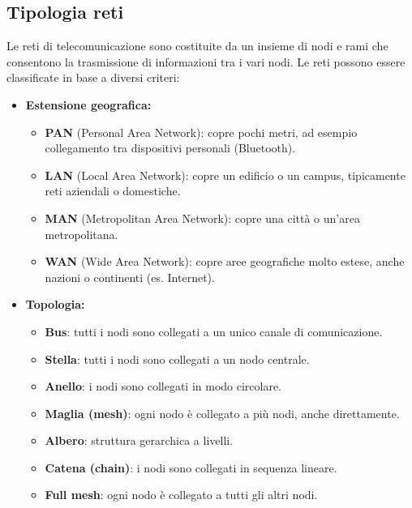 \subsection{Tipologia reti}
Le reti di telecomunicazione sono costituite da un insieme di nodi e rami che consentono la trasmissione di informazioni tra i vari nodi. Le reti possono essere classificate in base a diversi criteri:
\begin{itemize}
    \item \textbf{Estensione geografica:}
    \begin{itemize}
        \item \textbf{PAN} (Personal Area Network): copre pochi metri, ad esempio collegamento tra dispositivi personali (Bluetooth).
        \item \textbf{LAN} (Local Area Network): copre un edificio o un campus, tipicamente reti aziendali o domestiche.
        \item \textbf{MAN} (Metropolitan Area Network): copre una città o un'area metropolitana.
        \item \textbf{WAN} (Wide Area Network): copre aree geografiche molto estese, anche nazioni o continenti (es. Internet).
    \end{itemize}
    \item \textbf{Topologia:}
    \begin{itemize}
        \item \textbf{Bus}: tutti i nodi sono collegati a un unico canale di comunicazione.
        \item \textbf{Stella}: tutti i nodi sono collegati a un nodo centrale.
        \item \textbf{Anello}: i nodi sono collegati in modo circolare.
        \item \textbf{Maglia (mesh)}: ogni nodo è collegato a più nodi, anche direttamente.
        \item \textbf{Albero}: struttura gerarchica a livelli.
        \item \textbf{Catena (chain)}: i nodi sono collegati in sequenza lineare.
        \item \textbf{Full mesh}: ogni nodo è collegato a tutti gli altri nodi.
    \end{itemize}

\end{itemize}
